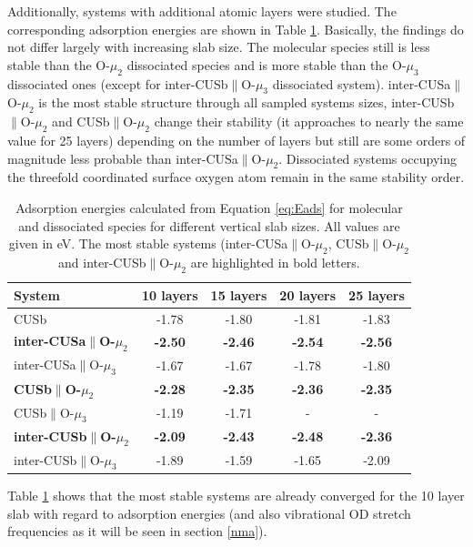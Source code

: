 \documentclass[11pt,DIV=13,BCOR=5mm,a4paper,headinclude]{scrbook}
\begin{document}
Additionally, systems with additional atomic layers were studied.
The corresponding adsorption energies are shown in Table \ref{tab:eads_layers}.
Basically, the findings do not differ largely with increasing slab size.
The molecular species still is less stable than the O-$\mu_2$ dissociated species and is more stable than the O-$\mu_3$ dissociated ones (except for inter-CUSb$\parallel$O-$\mu_3$ dissociated system).
inter-CUSa$\parallel$O-$\mu_2$ is the most stable structure through all sampled systems sizes, inter-CUSb$\parallel$O-$\mu_2$ and CUSb$\parallel$O-$\mu_2$ change their stability (it approaches to nearly the same value for 25 layers) depending on the number of layers but still are some orders of magnitude less probable than inter-CUSa$\parallel$O-$\mu_2$.
Dissociated systems occupying the threefold coordinated surface oxygen atom remain in the same stability order.
\begin{table}[!ht]
  \centering
  \caption{Adsorption energies calculated from Equation \ref{eq:Eads} for molecular and dissociated species for different vertical slab sizes.
All values are given in eV.
The most stable systems (inter-CUSa$\parallel$O-$\mu_2$, CUSb$\parallel$O-$\mu_2$ and inter-CUSb$\parallel$O-$\mu_2$ are highlighted in bold letters.}
 \begin{tabular}{l|cccc}
 \toprule
 System                     & 10 layers& 15 layers& 20 layers&  25 layers \\\midrule
CUSb                                    &-1.78 &-1.80     &-1.81     &-1.83      \\\hline
\textbf{inter-CUSa$\parallel$O-$\mu_2$}    &\textbf{-2.50} &\textbf{-2.46} &\textbf{-2.54} &\textbf{-2.56}  \\
inter-CUSa$\parallel$O-$\mu_3$          &-1.67 &-1.67 &-1.78 &-1.80 \\
\textbf{CUSb$\parallel$O-$\mu_2$}          &\textbf{-2.28} &\textbf{-2.35} &\textbf{-2.36} &\textbf{-2.35} \\
CUSb$\parallel$O-$\mu_3$                &-1.19 &-1.71 &-     &-      \\
\textbf{inter-CUSb$\parallel$O-$\mu_2$}    &\textbf{-2.09} &\textbf{-2.43} &\textbf{-2.48} &\textbf{-2.36}  \\
inter-CUSb$\parallel$O-$\mu_3$          &-1.89 &-1.59 &-1.65 &-2.09 \\\bottomrule
\end{tabular}
\label{tab:eads_layers}
\end{table}
Table \ref{tab:eads_layers} shows that the most stable systems are already converged for the 10 layer slab with regard to adsorption energies (and also vibrational OD stretch frequencies as it will be seen in section \ref{nma}).
\end{document}
